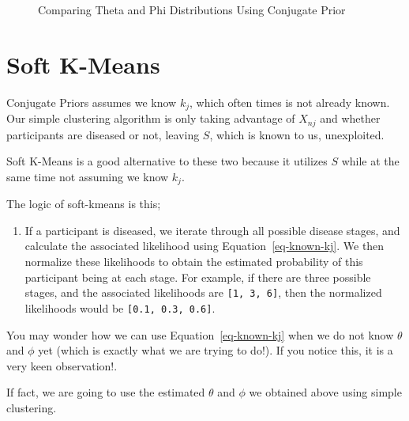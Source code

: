 \documentclass[
  letterpaper,
  DIV=11,
  numbers=noendperiod]{scrreprt}
\providecommand{\tightlist}{%
  \setlength{\itemsep}{0pt}\setlength{\parskip}{0pt}}\usepackage{longtable,booktabs,array}
\begin{document}
\begin{figure}[H]


\caption{\label{fig-estdistparamscp}Comparing Theta and Phi
Distributions Using Conjugate Prior}

\end{figure}%

\section{Soft K-Means}\label{sec-soft-kmeans}

Conjugate Priors assumes we know \(k_j\), which often times is not
already known. Our simple clustering algorithm is only taking advantage
of \(X_{nj}\) and whether participants are diseased or not, leaving
\(S\), which is known to us, unexploited.

Soft K-Means is a good alternative to these two because it utilizes
\(S\) while at the same time not assuming we know \(k_j\).

The logic of soft-kmeans is this;

\begin{enumerate}
\def\labelenumi{\arabic{enumi}.}
\tightlist
\item
  If a participant is diseased, we iterate through all possible disease
  stages, and calculate the associated likelihood using
  Equation~\ref{eq-known-kj}. We then normalize these likelihoods to
  obtain the estimated probability of this participant being at each
  stage. For example, if there are three possible stages, and the
  associated likelihoods are \texttt{{[}1,\ 3,\ 6{]}}, then the
  normalized likelihoods would be \texttt{{[}0.1,\ 0.3,\ 0.6{]}}.
\end{enumerate}

\begin{tcolorbox}[enhanced jigsaw, breakable, bottomtitle=1mm, toprule=.15mm, colframe=quarto-callout-tip-color-frame, colbacktitle=quarto-callout-tip-color!10!white, arc=.35mm, bottomrule=.15mm, left=2mm, opacitybacktitle=0.6, toptitle=1mm, colback=white, opacityback=0, title=\textcolor{quarto-callout-tip-color}{\faLightbulb}\hspace{0.5em}{Tip}, titlerule=0mm, rightrule=.15mm, leftrule=.75mm, coltitle=black]

You may wonder how we can use Equation~\ref{eq-known-kj} when we do not
know \(\theta\) and \(\phi\) yet (which is exactly what we are trying to
do!). If you notice this, it is a very keen observation!.

If fact, we are going to use the estimated \(\theta\) and \(\phi\) we
obtained above using simple clustering.

\end{tcolorbox}
\end{document}
